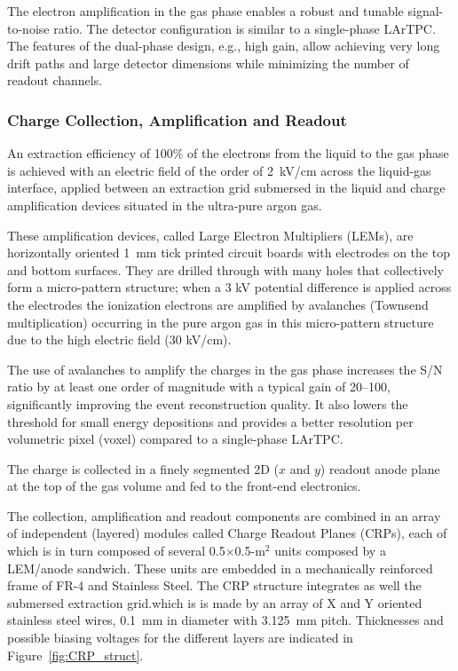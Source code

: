 The electron amplification in the gas phase enables a robust and tunable signal-to-noise ratio. 
The detector configuration is similar to a single-phase LArTPC. The features of the dual-phase design, e.g., high gain, 
allow achieving very long drift paths and large detector dimensions while minimizing the number of readout channels.

\subsubsection{Charge Collection, Amplification and Readout}

An extraction efficiency of 100\% of the electrons from the liquid to
the gas phase is achieved with an electric field of the order of
2~kV/cm across the liquid-gas interface, applied between an 
extraction grid submersed in the liquid and charge amplification 
devices situated in the ultra-pure argon gas. 

These amplification devices, called Large Electron Multipliers (LEMs), are horizontally oriented 1~mm tick printed 
circuit boards with electrodes on the top and bottom surfaces. They are drilled
through with many holes that collectively form a micro-pattern structure;  
when a 3 kV potential difference is applied across the electrodes
the ionization electrons are amplified by avalanches (Townsend multiplication) occurring in the 
pure argon gas in this micro-pattern structure\cite{Bondar:2008yw} due to the high electric field (30 kV/cm).

The use of avalanches to amplify the charges in the gas phase increases
the S/N ratio by at least one order of magnitude with a typical gain of 20--100, significantly
improving the event reconstruction quality. It also lowers the
threshold for small energy depositions and provides a better
resolution per volumetric pixel (voxel) compared to a single-phase
LArTPC. 

The charge is collected in a finely segmented 2D ($x$ and $y$) readout anode
plane at the top of the gas volume and fed to the front-end electronics.   

The  collection, amplification and readout components are combined in an array of 
independent (layered) modules called Charge Readout Planes (CRPs), each of which is in
 turn composed of several 0.5$\times$0.5-m$^2$ units composed  by a LEM/anode sandwich. 
These units are embedded in a mechanically reinforced frame of FR-4 and Stainless Steel. The CRP structure integrates
as well the submersed extraction grid.which is is made by an array of X and Y oriented stainless steel wires, 0.1~mm in diameter with 3.125~mm
pitch. Thicknesses and possible biasing voltages for the different layers are indicated in Figure~\ref{fig:CRP_struct}.

